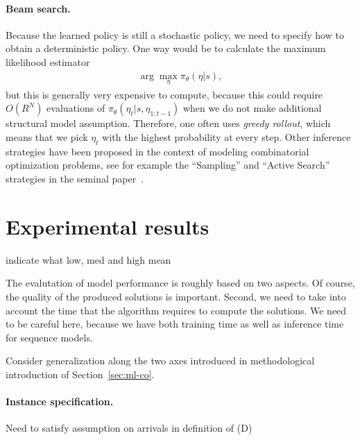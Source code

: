 \documentclass[a4paper]{report}
\theoremstyle{definition}
\theoremstyle{plain}
\newcommand\note[1]{{\color{Navy}#1}}
\begin{document}
\paragraph{Beam search.}

Because the learned policy is still a stochastic policy, we need to specify how
to obtain a deterministic policy.
%
One way would be to calculate the maximum likelihood estimator
\begin{align*}
  \arg\max_{\eta} \pi_\theta(\eta | s) ,
\end{align*}
but this is generally very expensive to compute, because this could require
$O(R^{N})$ evaluations of $\pi_\theta(\eta_{t} | s, \eta_{1:t-1})$ when we do
not make additional structural model assumption.
%
Therefore, one often uses \textit{greedy rollout}, which means that we pick $\eta_{t}$ with
the highest probability at every step.
Other inference strategies have been proposed in the context of modeling
combinatorial optimization problems, see for example the ``Sampling'' and
``Active Search'' strategies in the seminal
paper~\cite{belloNeuralCombinatorialOptimization2017}.


\clearpage
\section{Experimental results}\label{sec:results}

\note{indicate what low, med and high mean}

The evalutation of model performance is roughly based on two aspects. Of course,
the quality of the produced solutions is important. Second, we need to take into
account the time that the algorithm requires to compute the solutions. We need
to be careful here, because we have both training time as well as inference
time for sequence models.

Consider generalization along the two axes introduced in methodological
introduction of Section~\ref{sec:ml-co}.
%

\paragraph{Instance specification.}

\note{Need to satisfy assumption on arrivals in definition of (D)}
\end{document}
